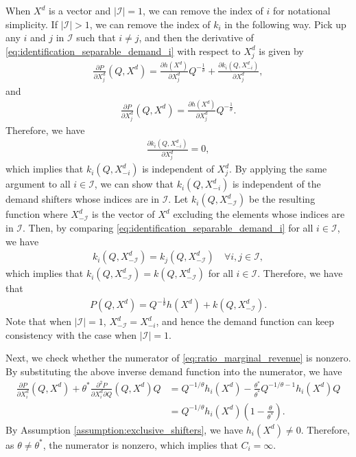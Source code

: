 \documentclass[11pt, a4paper]{article}
\theoremstyle{remark}
\begin{document}
When $X^{d}$ is a vector and $|\mathcal{I}| = 1$, we can remove the index of $i$ for notational simplicity.
If $|\mathcal{I}| > 1$, we can remove the index of $k_i$ in the following way.
Pick up any $i$ and $j$ in $\mathcal{I}$ such that $i \ne j$, and then the derivative of \eqref{eq:identification_separable_demand_i} with respect to $X^{d}_j$ is given by
\begin{align}
    \frac{\partial P}{\partial X^{d}_j}(Q, X^{d}) = \frac{\partial h(X^{d})}{\partial X^{d}_j} Q^{-\frac{1}{\theta}} + \frac{\partial k_i(Q, X^{d}_{-i})}{\partial X^{d}_j},
\end{align}
and
\begin{align}
    \frac{\partial P}{\partial X^{d}_j}(Q, X^{d}) = \frac{\partial h(X^{d})}{\partial X^{d}_j} Q^{-\frac{1}{\theta}}.
\end{align}
Therefore, we have
\begin{align}
    \frac{\partial k_i(Q, X^{d}_{-i})}{\partial X^{d}_j} = 0,
\end{align} 
which implies that $k_i(Q, X^{d}_{-i})$ is independent of $X^{d}_j$.
By applying the same argument to all $i \in \mathcal{I}$, we can show that $k_i(Q, X^{d}_{-i})$ is independent of the demand shifters whose indices are in $\mathcal{I}$.
Let $k_i(Q, X^{d}_{-\mathcal{I}})$ be the resulting function where $X^{d}_{-\mathcal{I}}$ is the vector of $X^{d}$ excluding the elements whose indices are in $\mathcal{I}$.
Then, by comparing \eqref{eq:identification_separable_demand_i} for all $i \in \mathcal{I}$, we have
\begin{align}
    k_i(Q, X^{d}_{-\mathcal{I}}) = k_j(Q, X^{d}_{-\mathcal{I}}) \quad \forall i,j \in \mathcal{I},
\end{align}
which implies that $k_i(Q, X^{d}_{-\mathcal{I}}) = k(Q, X^{d}_{-\mathcal{I}})$ for all $i \in \mathcal{I}$.
Therefore, we have that
\begin{align}
    P(Q, X^{d}) = Q^{-\frac{1}{\theta}}h(X^{d}) + k(Q, X^{d}_{-\mathcal{I}}).
\end{align}
Note that when $|\mathcal{I}| = 1$, $X^{d}_{-\mathcal{I}} = X^{d}_{-i}$, and hence the demand function can keep consistency with the case when $|\mathcal{I}| = 1$.


Next, we check whether the numerator of \eqref{eq:ratio_marginal_revenue} is nonzero.
By substituting the above inverse demand function into the numerator, we have
\begin{align}
    \frac{\partial P}{\partial X^{d}_{i}}(Q, X^{d}) + \theta^{*}\frac{\partial^2 P}{\partial X^{d}_{i}\partial Q}(Q, X^{d})Q  &= Q^{-1/\theta} h_i(X^d) - \frac{\theta^{*}}{\theta^{*}} Q^{-1/\theta-1} h_i(X^d) Q\\
    &= Q^{-1/\theta} h_i(X^d) \left(1 - \frac{\theta}{\theta^{*}} \right).
\end{align}
By Assumption \ref{assumption:exclusive_shifters}, we have $h_i(X^d) \ne 0$.
Therefore, as $\theta \ne \theta^{*}$, the numerator is nonzero, which implies that $C_i = \infty$.
\end{document}
